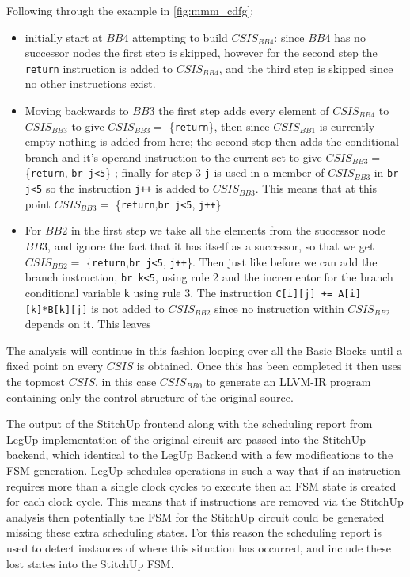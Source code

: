 Following through the example in \ref{fig:mmm_cdfg}:
\begin{itemize}
\item initially start at $BB4$ attempting to build $CSIS_{BB4}$:
since $BB4$ has no successor nodes the first step is skipped, however for the second step the \lstinline{return}
instruction is added to $CSIS_{BB4}$, and the third step is skipped since no other instructions exist.

\item Moving backwards to $BB3$ the first step adds every element of $CSIS_{BB4}$ to $CSIS_{BB3}$ to give 
$CSIS_{BB3}=$ \{\lstinline{return}\}, then since $CSIS_{BB1}$ is currently empty nothing is added from here; the second step then adds the conditional branch and it's operand
instruction to the current set to give $CSIS_{BB3}= $\{\lstinline{return}, \lstinline{br j<5}\} ;
finally for step 3 \lstinline{j} is used in a member of $CSIS_{BB3}$ in \lstinline{br j<5} so the instruction
\lstinline{j++} is added to $CSIS_{BB3}$. This means that at this point $CSIS_{BB3} =$
\{\lstinline{return},\lstinline{br j<5}, \lstinline{j++}\}

\item For $BB2$ in the first step we take all the elements from the successor node $BB3$, and ignore the fact
that it has itself as a successor, so that we get $CSIS_{BB2} =$ \{\lstinline{return},\lstinline{br j<5}, \lstinline{j++}\}.
Then just like before we can add the branch instruction, \lstinline{br k<5}, using rule 2 and the incrementor for the branch
conditional variable \lstinline{k} using rule 3. 
The instruction \lstinline{C[i][j] += A[i][k]*B[k][j]} is not added to $CSIS_{BB2}$ since no instruction
within $CSIS_{BB2}$ depends on it. This leaves 

\end{itemize}

The analysis will continue in this fashion looping over all the Basic Blocks until a fixed
point on every $CSIS$ is obtained.
Once this has been completed it then uses the topmost $CSIS$, in this case $CSIS_{BB0}$ to
generate an LLVM-IR program containing only the control structure of the original
source.

The output of the StitchUp frontend along with the scheduling report from LegUp
implementation of the original circuit are passed into the StitchUp backend, which identical
to the LegUp Backend with a few modifications to the FSM generation.
LegUp schedules operations in such a way that if an instruction requires more than a single
clock cycles to execute then an FSM state is created for each clock cycle.
This means that if instructions are removed via the StitchUp analysis then potentially
the FSM for the StitchUp circuit could be generated missing these extra scheduling states.
For this reason the scheduling report is used to detect instances of where this situation has occurred,
and include these lost states into the StitchUp FSM.


